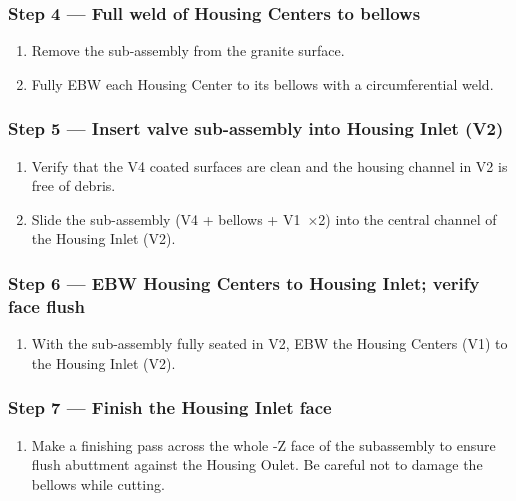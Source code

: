 \documentclass[12pt, letterpaper]{report}%
\newcounter{mycounter}           %
\newcounter{sub}[mycounter]      %
\begin{document}
\subsubsection*{Step 4 --- Full weld of Housing Centers to bellows}

\begin{enumerate}[itemsep=4pt]
	\item Remove the sub-assembly from the granite surface.
	\item Fully EBW each Housing Center to its bellows with a circumferential weld.
\end{enumerate}

\subsubsection*{Step 5 --- Insert valve sub-assembly into Housing Inlet (V2)}

\begin{enumerate}[itemsep=4pt]
	\item Verify that the V4 coated surfaces are clean and the housing channel in V2 is
				free of debris.
	\item Slide the sub-assembly (V4 + bellows + V1~$\times$2) into the central
				channel of the Housing Inlet (V2).
\end{enumerate}

\subsubsection*{Step 6 --- EBW Housing Centers to Housing Inlet; verify face flush}

\begin{enumerate}[itemsep=4pt]
	\item With the sub-assembly fully seated in V2, EBW the Housing Centers (V1) to
				the Housing Inlet (V2).
\end{enumerate}

\subsubsection*{Step 7 --- Finish the Housing Inlet face}

\begin{enumerate}[itemsep=4pt]
	\item Make a finishing pass across the whole -Z face of the subassembly to
				ensure flush abuttment against the Housing Oulet.
				Be careful not to damage the bellows while cutting.
\end{enumerate}
\end{document}
